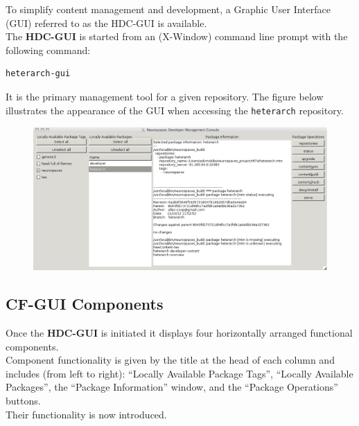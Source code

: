 \documentclass[12pt]{article}
\begin{document}
To simplify content management and development, a Graphic User Interface (GUI) referred to as the HDC-GUI is available.\\
\noindent The {\small \bf HDC-GUI} is started from an (X-Window) command line prompt with the following command:
\begin{verbatim}
heterarch-gui
\end{verbatim}
It is the primary management tool for a given repository. The figure below illustrates the appearance of the GUI when accessing the {\tt \small heterarch} repository.

\begin{figure}[h]
   \centering
   \includegraphics[scale=0.4]{figures/heterarch-developer-content-gui.eps}
\end{figure}

\subsection{CF-GUI Components}

Once the {\bf \small HDC-GUI} is initiated it displays four horizontally arranged functional components.\\
Component functionality is given by the title at the head of each column and includes (from left to right): ``Locally Available Package Tags'', ``Locally Available Packages'', the ``Package Information'' window, and the ``Package Operations'' buttons.\\
Their functionality is now introduced.
\end{document}
